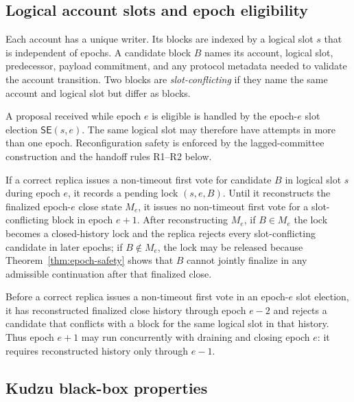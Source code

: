 \documentclass[11pt]{article}
\theoremstyle{definition}
\theoremstyle{remark}
\newcommand{\SE}{\mathsf{SE}}
\begin{document}
\subsection{Logical account slots and epoch eligibility}

Each account has a unique writer. Its blocks are indexed by a logical slot $s$ that is independent of epochs. A candidate block $B$ names its account, logical slot, predecessor, payload commitment, and any protocol metadata needed to validate the account transition. Two blocks are \emph{slot-conflicting} if they name the same account and logical slot but differ as blocks.

A proposal received while epoch $e$ is eligible is handled by the epoch-$e$ slot election $\SE(s,e)$. The same logical slot may therefore have attempts in more than one epoch. Reconfiguration safety is enforced by the lagged-committee construction and the handoff rules R1--R2 below.

\begin{description}[leftmargin=2.4em,labelindent=0em]
\item[R1 (pending-slot lock and handoff).]
If a correct replica issues a non-timeout first vote for candidate $B$ in logical slot $s$ during epoch $e$, it records a pending lock $(s,e,B)$. Until it reconstructs the finalized epoch-$e$ close state $M_e$, it issues no non-timeout first vote for a slot-conflicting block in epoch $e+1$. After reconstructing $M_e$, if $B\in M_e$ the lock becomes a closed-history lock and the replica rejects every slot-conflicting candidate in later epochs; if $B\notin M_e$, the lock may be released because Theorem~\ref{thm:epoch-safety} shows that $B$ cannot jointly finalize in any admissible continuation after that finalized close.

\item[R2 (reconstructed close-history prerequisite).]
Before a correct replica issues a non-timeout first vote in an epoch-$e$ slot election, it has reconstructed finalized close history through epoch $e-2$ and rejects a candidate that conflicts with a block for the same logical slot in that history. Thus epoch $e+1$ may run concurrently with draining and closing epoch $e$: it requires reconstructed history only through $e-1$.
\end{description}

\subsection{Kudzu black-box properties}
\end{document}
